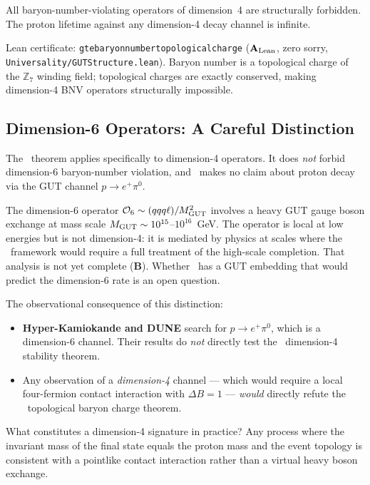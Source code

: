 \documentclass[11pt,openany]{book}
\theoremstyle{remark}
\newcommand{\GTE}{\text{GTE}}
\newcommand{\lean}[1]{%
  \penalty-100
  \begingroup\def\_{\textunderscore\allowbreak}\texttt{#1}\endgroup}
\newcommand{\CatAL}{\ensuremath{\textbf{A}_{\rm Lean}}}
\newcommand{\CatB}{\textbf{B}}
\begin{document}
\begin{tcolorbox}[colback=orange!5,colframe=orange!60,
  title={Result: Proton Dimension-4 Stability (\CatAL)}]
All baryon-number-violating operators of dimension~4 are structurally forbidden.
The proton lifetime against any dimension-4 decay channel is infinite.

Lean certificate: \lean{gte\_baryon\_number\_topological\_charge} (\CatAL, zero sorry,
\texttt{Universality/GUTStructure.lean}).  Baryon number is a topological charge of
the $\mathbb{Z}_7$ winding field; topological charges are exactly conserved,
making dimension-4 BNV operators structurally impossible.
\end{tcolorbox}

\subsection*{Dimension-6 Operators: A Careful Distinction}

The \GTE\ theorem applies specifically to dimension-4 operators.  It does \emph{not}
forbid dimension-6 baryon-number violation, and \GTE\ makes no claim about proton
decay via the GUT channel $p \to e^+\pi^0$.

The dimension-6 operator $\mathcal{O}_6 \sim (q q q \ell) / M_{\rm GUT}^2$ involves
a heavy GUT gauge boson exchange at mass scale $M_{\rm GUT} \sim 10^{15}$--$10^{16}$~GeV.
The operator is local at low energies but is not dimension-4: it is mediated by physics
at scales where the \GTE\ framework would require a full treatment of the high-scale
completion.  That analysis is not yet complete (\CatB).  Whether \GTE\ has a GUT
embedding that would predict the dimension-6 rate is an open question.

The observational consequence of this distinction:
\begin{itemize}
\item \textbf{Hyper-Kamiokande and DUNE} search for $p \to e^+\pi^0$, which is a
  dimension-6 channel.  Their results do \emph{not} directly test the \GTE\ dimension-4
  stability theorem.
\item Any observation of a \emph{dimension-4} channel --- which would require a local
  four-fermion contact interaction with $\Delta B = 1$ --- \emph{would} directly refute
  the \GTE\ topological baryon charge theorem.
\end{itemize}

What constitutes a dimension-4 signature in practice?  Any process where the invariant
mass of the final state equals the proton mass and the event topology is consistent with
a pointlike contact interaction rather than a virtual heavy boson exchange.
\end{document}
